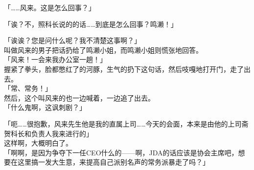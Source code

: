 「……风来。这是怎么回事？」

「诶？不，照科长说的的话……到底是怎么回事？鸣濑！」

「诶诶？您是问什么呢？我不清楚这事啊？」\\

叫做风来的男子把话扔给了鸣濑小姐，而鸣濑小姐则慌张地回答。\\

「风来！一会来我办公室一趟！」\\

握紧了拳头，脸都憋红了的河豚，生气的扔下这句话，然后吱嘎地打开门，走了出去。\\

「常、常务！」\\

然后，这个叫风来的也一边喊着，一边追了出去。\\

「什么鬼啊，这讽刺剧？」

「呃……很抱歉，风来先生他是我的直属上司……今天的会面，本来是由他的上司斋贺科长和负责人我来进行的」\\

这样啊，大概明白了。\\

「啊啊，是因为争夺下一任CEO什么的——啊，JDA的话应该是协会主席吧，想要在这里搞一发大生意，来提高自己派别名声的常务派暴走了吗？」

